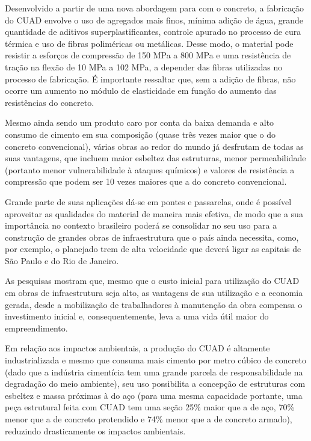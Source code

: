 \documentclass[
	12pt,				%
	openright,			%
	oneside,			%
	a4paper,			%
	chapter=TITLE,		%
	english,			%
	french,				%
	spanish,			%
	brazil				%
	]{abntex2}
\begin{document}
Desenvolvido a partir de uma nova abordagem para com o concreto, a fabricação do CUAD envolve o uso de agregados mais finos, mínima adição de água, grande quantidade de aditivos superplastificantes, controle apurado no processo de cura térmica e uso de fibras poliméricas ou metálicas. Desse modo, o material pode resistir a esforços de compressão de 150 MPa a 800 MPa e uma resistência de tração na flexão de 10 MPa a 102 MPa, a depender das fibras utilizadas no processo de fabricação. É importante ressaltar que, sem a adição  de fibras, não ocorre um aumento no módulo de elasticidade em função do aumento das resistências do concreto.

Mesmo ainda sendo um produto caro por conta da baixa demanda e alto consumo de cimento em sua composição (quase três vezes maior que o do concreto convencional), várias obras ao redor do mundo já desfrutam de todas as suas vantagens, que incluem maior esbeltez das estruturas, menor permeabilidade (portanto menor vulnerabilidade à ataques químicos) e valores de resistência a compressão que podem ser 10 vezes maiores que a do concreto convencional.

Grande parte de suas aplicações dá-se em pontes e passarelas, onde é possível aproveitar as qualidades do material de maneira mais efetiva, de modo que a sua importância no contexto brasileiro poderá se consolidar no seu uso para a construção de grandes obras de infraestrutura que o país ainda necessita, como, por exemplo, o planejado trem de alta velocidade que deverá ligar as capitais de São Paulo e do Rio de Janeiro.

As pesquisas mostram que, mesmo que o custo inicial para utilização do CUAD em obras de infraestrutura seja alto, as vantagens de sua utilização e a economia gerada, desde a mobilização de trabalhadores à manutenção da obra compensa o investimento inicial e, consequentemente, leva a uma vida útil maior do empreendimento.

Em relação aos impactos ambientais, a produção do CUAD é altamente industrializada e mesmo que consuma mais cimento por metro cúbico de concreto (dado que a indústria cimentícia tem uma grande parcela de responsabilidade na degradação do meio ambiente), seu uso possibilita a concepção de estruturas com esbeltez e massa próximas à do aço (para uma mesma capacidade portante, uma peça estrutural feita com CUAD tem uma seção 25\% maior que a de aço, 70\% menor que a de concreto protendido e 74\% menor que a de concreto armado), reduzindo drasticamente os impactos ambientais.
\end{document}
